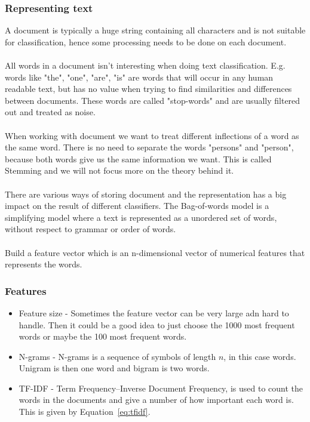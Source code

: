 \subsubsection{Representing text}
A document is typically a huge string containing all characters and is not suitable for classification, hence some processing needs to be done on each document.
\\\\
All words in a document isn't interesting when doing text classification. E.g. words like "the", "one", "are", "is" are words that will occur in any human readable text, but has no value when trying to find similarities and differences between documents. These words are called "stop-words" and are usually filtered out and treated as noise.
\\\\
When working with document we want to treat different inflections of a word as the same word. There is no need to separate the words "persons" and "person", because both words give us the same information we want. This is called Stemming and we will not focus more on the theory behind it.
\\\\
There are various ways of storing document and the representation has a big impact on the result of different classifiers. The Bag-of-words model is a simplifying model where a text is represented as a unordered set of words, without respect to grammar or order of words.
\\\\
Build a feature vector which is an n-dimensional vector of numerical features that represents the words.
\subsubsection{Features}
\begin{itemize}
\item Feature size - Sometimes the feature vector can be very large adn hard to handle. Then it could be a good idea to just choose the 1000 most frequent words or maybe the 100 most frequent words. \citep{joachims}
\item N-grams - N-grams is a sequence of symbols of length $n$, in this case words. Unigram is then one word and bigram is two words. \citep{ngrams_ai}
\item TF-IDF - Term Frequency–Inverse Document Frequency, is used to count the words in the documents and give a number of how important each word is. This is given by Equation~\ref{eq:tfidf}.
\end{itemize}

